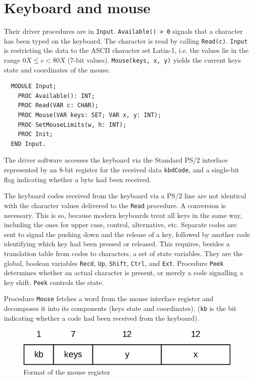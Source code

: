 \section{Keyboard and mouse}
\label{sec:kbm}
Their driver procedures are in \verb|Input|. \verb|Available() > 0| signals that a
character has been typed on the keyboard. The character is read by calling \verb|Read(c)|.
\verb|Input| is restricting the data to the ASCII character set Latin-1, i.e. the values
lie in the range $0X \le c < 80X$ (7-bit values). \verb|Mouse(keys, x, y)| yields the
current keys state and coordinates of the mouse.
\begin{verbatim}
  MODULE Input;
    PROC Available(): INT;
    PROC Read(VAR c: CHAR);
    PROC Mouse(VAR keys: SET; VAR x, y: INT);
    PROC SetMouseLimits(w, h: INT);
    PROC Init;
  END Input.
\end{verbatim}
The driver software accesses the keyboard via the Standard PS/2 interface represented by
an 8-bit register for the received data \verb|kbdCode|, and a single-bit flag indicating
whether a byte had been received.

The keyboard codes received from the keyboard via a PS/2 line are not identical with the
character values delivered to the \verb|Read| procedure. A conversion is necessary. This
is so, because modern keyboards treat all keys in the same way, including the ones for
upper case, control, alternative, etc. Separate codes are sent to signal the pushing down
and the release of a key, followed by another code identifying which key had been pressed
or released. This requires, besides a translation table from codes to characters, a set of
state variables. They are the global, boolean variables \verb|Recd|, \verb|Up|, \verb|Shift|,
\verb|Ctrl|, and \verb|Ext|. Procedure \verb|Peek| determines whether an actual character
is present, or merely a code signalling a key shift. \verb|Peek| controls the state.

Procedure \verb|Mouse| fetches a word from the mouse interface register and decomposes it
into its components (keys state and coordinates). (\verb|kb| is the bit indicating whether
a code had been received from the keyboard).
\begin{figure}[h!]
  \centering
  \includegraphics[width=.75\textwidth]{i/z}
  \caption{Format of the mouse register}
  \label{fig:format}
\end{figure}

